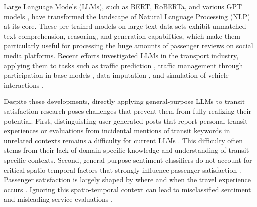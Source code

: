 \documentclass[a4paper,fleqn,12pt]{cas-sc}
\begin{document}
Large Language Models (LLMs), such as BERT, RoBERTa, and various GPT models \citep{liu2019roberta, cheng2024recent, lei2025deep}, have transformed the landscape of Natural Language Processing (NLP) at its core. These pre-trained models on large text data sets exhibit unmatched text comprehension, reasoning, and generation capabilities, which make them particularly useful for processing the huge amounts of passenger reviews on social media platforms. Recent efforts investigated LLMs in the transport industry, applying them to tasks such as traffic prediction \citep{li2024urbangpt}, traffic management through participation in base models \citep{zhang2024trafficgpt}, data imputation \citep{zhang2024semantic}, and simulation of vehicle interactions \citep{Li2025}.

Despite these developments, directly applying general-purpose LLMs to transit satisfaction research poses challenges that prevent them from fully realizing their potential. First, distinguishing user generated posts that report personal transit experiences or evaluations from incidental mentions of transit keywords in unrelated contexts remains a difficulty for current LLMs \citep{luo2023influential}. This difficulty often stems from their lack of domain-specific knowledge and understanding of transit-specific contexts. Second, general-purpose sentiment classifiers do not account for critical spatio-temporal factors that strongly influence passenger satisfaction \citep{cheng2025arrival}. Passenger satisfaction is largely shaped by where and when the travel experience occurs \citep{lei2020inferring}. Ignoring this spatio-temporal context can lead to misclassified sentiment and misleading service evaluations \citep{li2024urbangpt,zeng2024exploring}.


\end{document}
